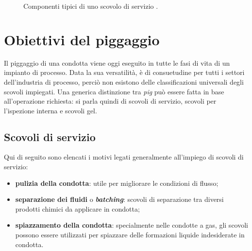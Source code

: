 \begin{figure}[htbp]
     \qquad
\caption{Componenti tipici di uno scovolo di servizio \parencite{williamson2015guide}.}
\label{fig:configurazione}
\end{figure}

\section{Obiettivi del piggaggio}
Il piggaggio di una condotta viene oggi eseguito in tutte le fasi di vita di un impianto di processo. Data la sua versatilità, è di consuetudine per tutti i settori dell'industria di processo, perciò non esistono delle classificazioni universali degli scovoli impiegati. Una generica distinzione tra \textit{pig} può essere fatta in base all'operazione richiesta: si parla quindi di scovoli di servizio, scovoli per l'ispezione interna e scovoli gel.

\subsection{Scovoli di servizio}
Qui di seguito sono elencati i motivi legati generalmente all'impiego di scovoli di servizio:
\begin{itemize}
	\item \textbf{pulizia della condotta}: utile per migliorare le condizioni di flusso;
	\item \textbf{separazione dei fluidi} o \textit{\textbf{batching}}: scovoli di separazione tra diversi prodotti chimici da applicare in condotta;
	\item \textbf{spiazzamento della condotta}: specialmente nelle condotte a gas, gli scovoli possono essere utilizzati per spiazzare delle formazioni liquide indesiderate in condotta.
\end{itemize}

